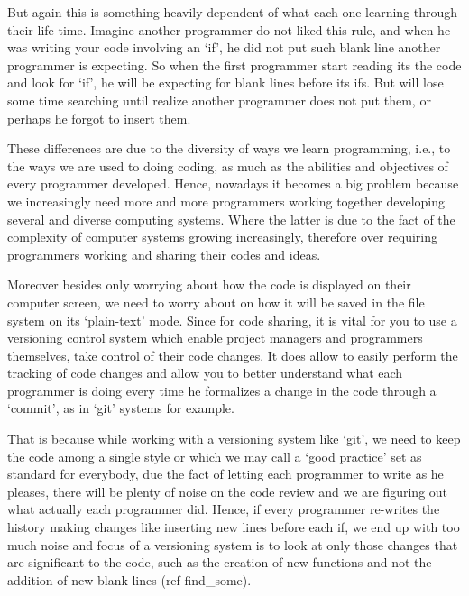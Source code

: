 {    But again this is something heavily dependent of what each one learning through their life time.
    Imagine another programmer do not liked this rule, and when he was writing your code involving
    an `if', he did not put such blank line another programmer is expecting. So when the first
    programmer start reading its the code and look for `if', he will be expecting for blank lines
    before its if\textquotesingle s. But will lose some time searching until realize another
    programmer does not put them, or perhaps he forgot to insert them. %

    These differences are due to the diversity of ways we learn programming, i.e., to the ways we
    are used to doing coding, as much as the abilities and objectives of every programmer developed.
    Hence, nowadays it becomes a big problem because we increasingly need more and more programmers
    working together developing several and diverse computing systems. Where the latter is due to
    the fact of the complexity of computer systems growing increasingly, therefore over requiring
    programmers working and sharing their codes and ideas. %

    Moreover besides only worrying about how the code is displayed on their computer screen, we need
    to worry about on how it will be saved in the file system on its `plain-text' mode. Since for
    code sharing, it is vital for you to use a versioning control system which enable project
    manager\textquotesingle s and programmers themselves, take control of their code changes. It does allow to
    easily perform the tracking of code changes and allow you to better understand what each
    programmer is doing every time he formalizes a change in the code through a `commit', as in
    `git' systems for example. %

    That is because while working with a versioning system like `git', we need to keep the code
    among a single style or which we may call a `good practice' set as standard for everybody, due
    the fact of letting each programmer to write as he pleases, there will be plenty of noise on the
    code review and we are figuring out what actually each programmer did. Hence, if every
    programmer re-writes the history making changes like inserting new lines before each if, we end
    up with too much noise and focus of a versioning system is to look at only those changes that
    are significant to the code, such as the creation of new functions and not the addition of new
    blank lines (ref find\_some). %

}
